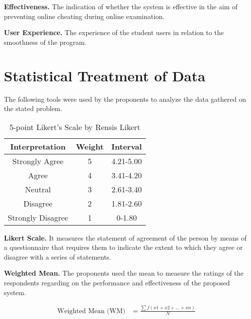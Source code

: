\textbf{Effectiveness.}
The indication of whether the system is effective in the aim of preventing online cheating during online examination.

\textbf{User Experience.}
The experience of the student users in relation to the smoothness of the program.

\section{Statistical Treatment of Data}

The following tools were used by the proponents to analyze the data gathered on the stated problem.

\begin{table}[h!]
   \begin{center}
      \begin{tabular}{|c|c|c|}
         \hline
         \textbf{Interpretation} & \textbf{Weight} & \textbf{Interval} \\
         \hline
         Strongly Agree          & 5               & 4.21-5.00         \\
         \hline
         Agree                   & 4               & 3.41-4.20         \\
         \hline
         Neutral                 & 3               & 2.61-3.40         \\
         \hline
         Disagree                & 2               & 1.81-2.60         \\
         \hline
         Strongly Disagree       & 1               & 0-1.80            \\
         \hline
      \end{tabular}
   \end{center}
   \caption{5-point Likert’s Scale by Rensis Likert}
\end{table}

\textbf{Likert Scale.}
It measures the statement of agreement of the person by means of a questionnaire that requires them to indicate the extent to which they agree or disagree with a series of statements.

\textbf{Weighted Mean.}
The proponents used the mean to measure the ratings of the respondents regarding on the performance and effectiveness of the proposed system.

\begin{equation*}
   \begin{split}
      \text{Weighted Mean (WM)} & = \frac{\sum f(x1 + x2 + ... + xn)}{N} \\
   \end{split}
\end{equation*}

